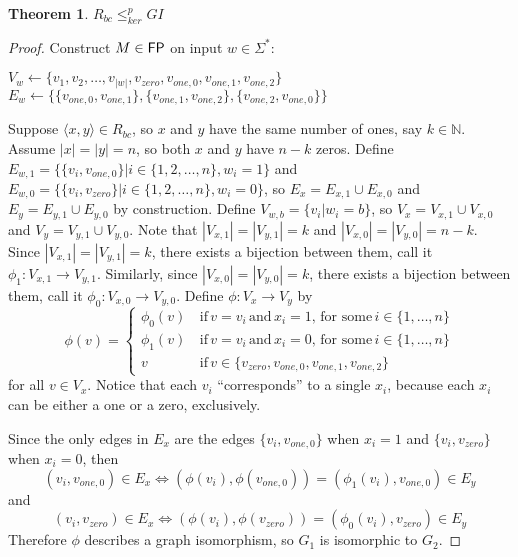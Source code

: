 \documentclass{article}
\newtheorem{theorem}{Theorem}[section]
\theoremstyle{definition} \newtheorem{definition}[definition]{Definition}
\newcommand{\plain}[1]{\,\text{#1}\,} %
\newcommand{\sigmastar}{\Sigma^{*}} %
\newcommand{\kr}{\leq^{p}_{ker}} %
\newcommand{\pair}[2]{\langle#1,#2\rangle} %
\begin{document}
\begin{theorem}\label{thm:rbc_gi}$R_{bc}\kr GI$\end{theorem}
\begin{proof}
  Construct $M\in {\ensuremath{\mathsf{FP}}}$ on input $w \in \sigmastar$:\\
  \begin{algorithm}[H]
    $V_w\gets\{v_1, v_2, \ldots, v_{|w|}, v_{zero}, v_{one,0}, v_{one,1},
    v_{one,2}\}$\;
    $E_w\gets\{\{v_{one,0}, v_{one,1}\}, \{v_{one,1}, v_{one,2}\}, \{v_{one,2},
    v_{one,0}\}\}$\;
  \end{algorithm}
  
  Suppose $\pair{x}{y}\in R_{bc}$, so $x$ and $y$ have the same number of ones,
  say $k\in\mathbb{N}$. Assume $|x|=|y|=n$, so both $x$ and $y$ have $n-k$
  zeros. Define $E_{w,1}=\{\{v_i, v_{one,0}\}|i\in\{1,2,\ldots,n\}, w_i = 1\}$
  and $E_{w,0}=\{\{v_i, v_{zero}\}|i\in\{1,2,\ldots,n\}, w_i = 0\}$, so $E_x =
  E_{x,1}\cup E_{x,0}$ and $E_y = E_{y,1} \cup E_{y,0}$ by construction. Define
  $V_{w,b}=\{v_i|w_i=b\}$, so $V_x=V_{x,1} \cup V_{x,0}$ and $V_y=V_{y,1} \cup
  V_{y,0}$. Note that $|V_{x,1}|=|V_{y,1}|=k$ and
  $|V_{x,0}|=|V_{y,0}|=n-k$. Since $|V_{x,1}|=|V_{y,1}|=k$, there exists a
  bijection between them, call it $\phi_1\colon V_{x,1}\to V_{y,1}$. Similarly,
  since $|V_{x,0}|=|V_{y,0}|=k$, there exists a bijection between them, call it
  $\phi_0\colon V_{x,0}\to V_{y,0}$. Define $\phi\colon V_x\to V_y$ by
  \begin{displaymath}
    \phi(v) = 
    \begin{cases}
      \phi_0(v) & \plain{if} v = v_i \plain{and} x_i = 1, \plain{for some}
      i\in\{1,\ldots,n\}\\ 
      \phi_1(v) & \plain{if} v = v_i \plain{and} x_i = 0, \plain{for some}
      i\in\{1,\ldots,n\}\\ 
      v & \plain{if} v \in \{v_{zero}, v_{one,0}, v_{one,1}, v_{one,2}\}
    \end{cases}
  \end{displaymath}
  for all $v\in V_x$. Notice that each $v_i$ ``corresponds'' to a
  single $x_i$, because each $x_i$ can be either a one or a zero,
  exclusively.

  Since the only edges in $E_x$ are the edges $\{v_i, v_{one,0}\}$ when $x_i=1$
  and $\{v_i, v_{zero}\}$ when $x_i=0$, then
  \begin{displaymath}
    (v_i, v_{one,0})\in E_x \iff (\phi(v_i), \phi(v_{one,0}))=(\phi_1(v_i),
    v_{one,0})\in E_y
  \end{displaymath}
  and 
  \begin{displaymath}
    (v_i, v_{zero})\in E_x \iff (\phi(v_i), \phi(v_{zero})) = (\phi_0(v_i),
    v_{zero})\in E_y
  \end{displaymath}
  Therefore $\phi$ describes a graph isomorphism, so $G_1$ is isomorphic to
  $G_2$.
  

\end{proof}
\end{document}
